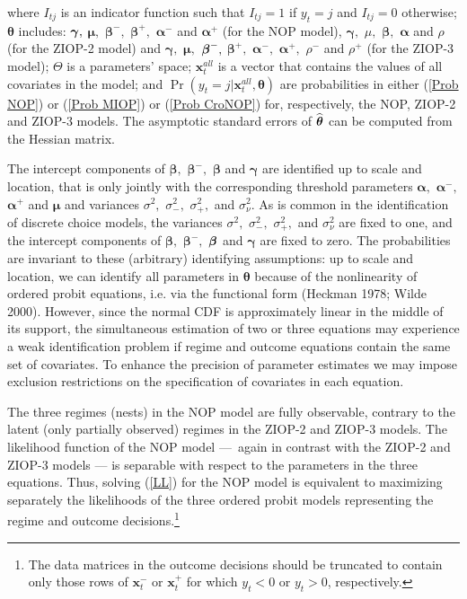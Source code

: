 \documentclass[letterpaper,fleqn,12pt]{article}
\begin{document}
\begin{onehalfspace}
\noindent where $I_{tj}$ is an indicator function such that $I_{tj}=1$ if $%
y_{t}=j$ and $I_{tj}=0$ otherwise; $\mathbf{\theta }$ includes: $\mathbf{%
\gamma ,}$ $\mathbf{\mu ,}$ $\mathbf{\beta }^{-},$ $\mathbf{\beta }^{+},$ $%
\mathbf{\alpha }^{-}$ and $\mathbf{\alpha }^{+}$ (for the NOP model), $%
\mathbf{\gamma },$ $\mu ,$ $\mathbf{\beta },$ $\mathbf{\alpha }$ and $\rho $
(for the ZIOP-2 model) and $\mathbf{\gamma },$ $\mathbf{\mu },$ $\mathbf{%
\beta }^{-},$ $\mathbf{\beta }^{+},$ $\mathbf{\alpha }^{-},$ $\mathbf{\alpha 
}^{+},$ $\rho ^{-}$ and $\rho ^{+}$ (for the ZIOP-3 model); $\Theta $ is a
parameters' space; $\mathbf{x}_{t}^{all}$ is a vector that contains the
values of all covariates in the model; and $\Pr (y_{t}=j|\mathbf{x}%
_{t}^{all},\mathbf{\theta })$ are probabilities in either (\ref{Prob NOP})
or (\ref{Prob MIOP}) or (\ref{Prob CroNOP}) for, respectively, the NOP,
ZIOP-2 and ZIOP-3 models. The asymptotic standard errors of $\widehat{%
\mathbf{\theta }}$ can be computed from the Hessian matrix.

The intercept components of $\mathbf{\beta ,}$ $\mathbf{\beta }^{-},$ $%
\mathbf{\beta }$ and $\mathbf{\gamma }$ are identified up to scale and
location, that is only jointly with the corresponding threshold parameters $%
\mathbf{\alpha ,}$ $\mathbf{\alpha }^{-}\mathbf{,}$ $\mathbf{\alpha }^{+}$
and $\mathbf{\mu }$ and variances $\sigma ^{2},$ $\sigma _{-}^{2},$ $\sigma
_{+}^{2},$ and $\sigma _{\nu }^{2}$. As is common in the identification of
discrete choice models, the variances $\sigma ^{2},$ $\sigma _{-}^{2},$ $%
\sigma _{+}^{2},$ and $\sigma _{\nu }^{2}$ are fixed to one, and the
intercept components of $\mathbf{\beta ,}$ $\mathbf{\beta }^{-},$ $\mathbf{%
\beta }$ and $\mathbf{\gamma }$ are fixed to zero. The probabilities are
invariant to these (arbitrary) identifying assumptions: up to scale and
location, we can identify all parameters in $\mathbf{\theta }$ because of
the nonlinearity of ordered probit equations, i.e. via the functional form
(Heckman 1978; Wilde 2000). However, since the normal CDF is approximately
linear in the middle of its support, the simultaneous estimation of two or
three equations may experience a weak identification problem if regime and
outcome equations contain the same set of covariates. To enhance the
precision of parameter estimates we may impose exclusion restrictions on the
specification of covariates in each equation.

The three regimes (nests) in the NOP model are fully observable, contrary to
the latent (only partially observed) regimes in the ZIOP-2 and ZIOP-3
models. The likelihood function of the NOP model ---\ again in contrast with
the ZIOP-2 and ZIOP-3 models --- is separable with respect to the parameters
in the three equations. Thus, solving (\ref{LL}) for the NOP model is
equivalent to maximizing separately the likelihoods of the three ordered
probit models representing the regime and outcome decisions.\footnote{
The data matrices in the outcome decisions should be truncated to contain
only those rows of $\mathbf{x}_{t}^{-}$ or $\mathbf{x}_{t}^{+}$ for which $%
y_{t}<0$ or $y_{t}>0$, respectively.}


\end{onehalfspace}
\end{document}
